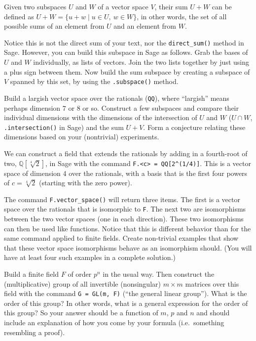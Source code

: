 \begin{sageverbatim}\end{sageverbatim}
%
%
Given two subspaces $U$ and $W$ of a vector space $V$, their sum $U+W$ can be defined as
$U+W=\{u+w\mid u\in U,\ w\in W\}$, in other words, the set of all possible sums of an element from $U$ and an element from $W$.\par
%
Notice this is not the direct sum of your text, nor the \verb?direct_sum()? method in Sage.  However, you can build this subspace in Sage as follows.  Grab the bases of $U$ and $W$ individually, as lists of vectors.  Join the two lists together by just using a plus sign between them.  Now build the sum subspace by creating a subspace of $V$ spanned by this set, by using the \verb?.subspace()? method.\par
%
Build a largish vector space over the rationals (\verb?QQ?), where ``largish'' means perhaps dimension $7$ or $8$ or so.  Construct a few subspaces and compare their individual dimensions with the dimensions of the intersection of $U$ and $W$ ($U\cap W$, \verb?.intersection()? in Sage) and the sum $U+V$.  Form a conjecture relating these dimensions based on your (nontrivial) experiments.
\begin{sageverbatim}\end{sageverbatim}
%
%
We can construct a field that extends the rationals by adding in a fourth-root of two, ${\mathbb Q}[\sqrt[4]{2}]$, in Sage with the command \verb?F.<c> = QQ[2^(1/4)]?.  This is a vector space of dimension 4 over the rationals, with a basis that is the first four powers of $c = \sqrt[4]{2}$ (starting with the zero power).\par
%
The command \verb?F.vector_space()? will return three items.  The first is a vector space over the rationals that is isomorphic to \verb?F?.  The next two are isomorphisms between the two vector spaces (one in each direction).  These two isomorphisms can then be used like functions.  Notice that this is different behavior than for the same command applied to finite fields.  Create non-trivial examples that show that these vector space isomorphisms behave as an isomorphism should.  (You will have at least four such examples in a complete solution.)
\begin{sageverbatim}\end{sageverbatim}
%
%
Build a finite field $F$ of order $p^n$ in the usual way.  Then construct the (multiplicative) group of all invertible (nonsingular) $m\times m$ matrices over this field with the command \verb?G = GL(m, F)? (``the general linear group'').  What is the order of this group?  In other words, what is a general expression for the order of this group?  So your answer should be a function of $m$, $p$ and $n$ and should include an explanation of how you come by your formula (i.e.\ something resembling a proof).\par
